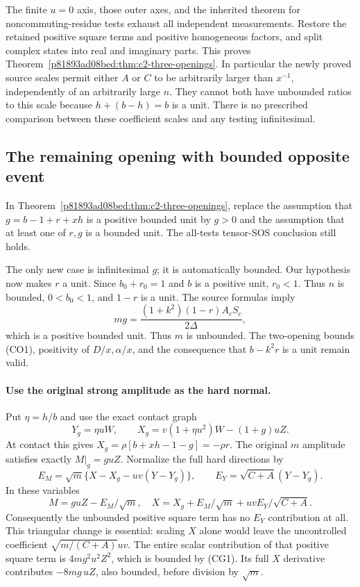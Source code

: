 The finite $u=0$ axis, those outer axes, and the inherited theorem for
noncommuting-residue tests exhaust all independent measurements.
Restore the retained positive square terms and positive homogeneous factors, and
split complex states into real and imaginary parts.  This proves
Theorem~\ref{p81893ad08bed:thm:c2-three-openings}.  In particular the newly proved
source scales permit either $A$ or $C$ to be arbitrarily larger than
$x^{-1}$, independently of an arbitrarily large $n$.  They cannot
both have unbounded ratios to this scale because $h+(b-h)=b$ is a unit.  There is no
prescribed comparison between these coefficient scales and any
testing infinitesimal.

\subsection{The remaining opening with bounded opposite event}
\label{component:pd7bd7f0d7fb6}

\label{pd7bd7f0d7fb6:sec:c2-last-opening}

\begin{theorem}
\label{pd7bd7f0d7fb6:thm:c2-no-opening-bounds}
In Theorem~\ref{p81893ad08bed:thm:c2-three-openings}, replace the assumption that
$g=b-1+r+xh$ is a positive bounded unit by $g>0$ and the assumption that at least one of $r,g$ is a bounded
unit.  The all-tests tensor-SOS conclusion still holds.
\end{theorem}

The only new case is infinitesimal $g$; it is automatically bounded.
Our hypothesis now makes $r$ a unit.  Since $b_0+r_0=1$ and $b$ is
a positive unit, $r_0<1$.  Thus $n$ is bounded,
$0<b_0<1$, and $1-r$ is a unit.  The source formulas imply
\[
               mg=\frac{(1+k^2)(1-r)A_cS_c}{2\Delta},   \tag{CG1}
\]
which is a positive bounded unit.  Thus $m$ is unbounded.  The
two-opening bounds (CO1), positivity of $D/x,\alpha/x$, and the
consequence that $b-k^2r$ is a unit remain valid.

\paragraph{Use the original strong amplitude as the hard normal.}
Put $\eta=h/b$ and use the exact contact graph
\[
 Y_g=\eta uW,\qquad
 X_g=v(1+\eta u^2)W-(1+g)uZ.                            \tag{CG2}
\]
At contact this gives $X_g=\rho[b+xh-1-g]=-\rho r$.
The original $m$ amplitude satisfies exactly $M|_g=guZ$.
Normalize the full hard directions by
\[
 E_M=\sqrt m\{X-X_g-uv(Y-Y_g)\},\qquad
 E_Y=\sqrt{C+A}(Y-Y_g).                                 \tag{CG3}
\]
In these variables
\[
 M=guZ-E_M/\sqrt m,
 \quad
 X=X_g+E_M/\sqrt m+uvE_Y/\sqrt{C+A}.
\]
Consequently the unbounded positive square term has no $E_Y$ contribution at all.
This triangular change is essential: scaling $X$ alone would leave
the uncontrolled coefficient $\sqrt{m/(C+A)}uv$.
The entire scalar contribution of that positive square term is $4mg^2u^2Z^2$,
which is bounded by (CG1).  Its full $X$ derivative contributes
$-8mg\,uZ$, also bounded, before division by $\sqrt m$.

